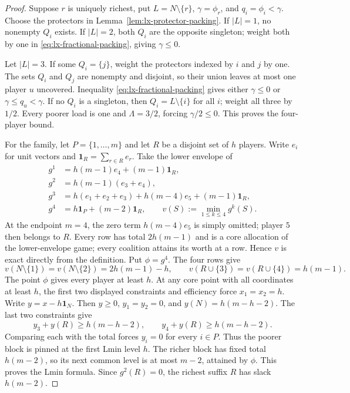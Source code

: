 \begin{proof}
Suppose $r$ is uniquely richest, put $L=N\setminus\{r\}$,
$\gamma=\phi_r$, and $q_i=\phi_i<\gamma$.  Choose the protectors in
Lemma~\ref{lem:lx-protector-packing}.  If $|L|=1$, no nonempty $Q_i$ exists.
If $|L|=2$, both $Q_i$ are the opposite singleton; weight both by one in
\eqref{eq:lx-fractional-packing}, giving $\gamma\leq0$.

Let $|L|=3$.  If some $Q_i=\{j\}$, weight the protectors indexed by $i$ and
$j$ by one.  The sets $Q_i$ and $Q_j$ are nonempty and disjoint, so their
union leaves at most one player $u$ uncovered.  Inequality
\eqref{eq:lx-fractional-packing} gives either $\gamma\leq0$ or
$\gamma\leq q_u<\gamma$.  If no $Q_i$ is a singleton, then
$Q_i=L\setminus\{i\}$ for all $i$; weight all three by $1/2$.  Every poorer
load is one and $\Lambda=3/2$, forcing $\gamma/2\leq0$.  This proves the
four-player bound.

For the family, let $P=\{1,\ldots,m\}$ and let $R$ be a disjoint set of
$h$ players.  Write $e_i$ for unit vectors and
$\mathbf1_R=\sum_{r\in R}e_r$.  Take the lower envelope of
\[
\begin{aligned}
g^1&=h(m-1)e_4+(m-1)\mathbf1_R,\\
g^2&=h(m-1)(e_3+e_4),\\
g^3&=h(e_1+e_2+e_3)+h(m-4)e_5+(m-1)\mathbf1_R,\\
g^4&=h\mathbf1_P+(m-2)\mathbf1_R,
\qquad
v(S):=\min_{1\leq k\leq4}g^k(S).
\end{aligned}                                        \tag{UF}
\label{eq:lx-unique-richest-family}
\]
At the endpoint $m=4$, the zero term $h(m-4)e_5$ is simply omitted; player
$5$ then belongs to $R$.
Every row has total $2h(m-1)$ and is a core allocation of the lower-envelope game;
every coalition attains its worth at a row.  Hence $v$ is exact directly from
the definition.  Put $\phi=g^4$.  The four rows give
\[
 v(N\setminus\{1\})=v(N\setminus\{2\})=2h(m-1)-h,
 \qquad v(R\cup\{3\})=v(R\cup\{4\})=h(m-1).   \tag{UF-T}
 \label{eq:lx-unique-richest-family-tight}
\]
The point $\phi$ gives every player at least $h$.  At any core point with all
coordinates at least $h$, the first two displayed constraints and efficiency
force $x_1=x_2=h$.  Write $y=x-h\mathbf1_N$.  Then
$y\geq0$, $y_1=y_2=0$, and $y(N)=h(m-h-2)$.  The last two constraints give
\[
 y_3+y(R)\geq h(m-h-2),\qquad
 y_4+y(R)\geq h(m-h-2).
\]
Comparing each with the total forces $y_i=0$ for every $i\in P$.  Thus the
poorer block is pinned at the first Lmin level $h$.  The richer block has
fixed total $h(m-2)$, so its next common level is at most $m-2$, attained by
$\phi$.  This proves the Lmin formula.  Since $g^2(R)=0$, the richest suffix
$R$ has slack $h(m-2)$.


\end{proof}
